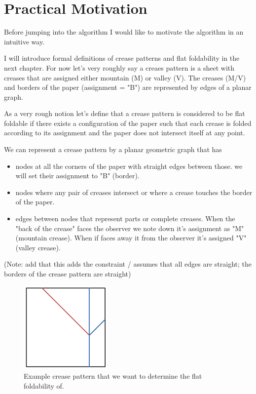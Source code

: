 \chapter{Practical Motivation}

Before jumping into the algorithm I would like to motivate the algorithm in an intuitive way.

I will introduce formal definitions of crease patterns and flat foldability in the next chapter.
For now let's very roughly say a creaes pattern is a sheet with creases that are assigned either mountain (M) or valley (V).
The creases (M/V) and borders of the paper (assignment = "B") are represented by edges of a planar graph.

As a very rough notion let's define that a crease pattern is considered to be flat foldable if there exists a configuration
of the paper such that each crease is folded according to its assignment and the paper does not intersect itself at any point.

We can represent a crease pattern by a planar geometric graph that has
\begin{itemize}
    \item{nodes at all the corners of the paper with straight edges between those. we will set their assignment to "B" (border).}
    \item nodes where any pair of creases intersect or where a crease touches the border of the paper.
    \item edges between nodes that represent parts or complete creases. When the "back of the crease" faces the observer we note down it's assignment as "M" (mountain crease). When if faces away it from the observer it's assigned "V" (valley crease).
\end{itemize}

(Note: add that this adds the constraint / assumes that all edges are straight; the borders of the crease pattern are straight)

\begin{figure}[h]
\centering
\includegraphics[width=0.4\textwidth]{assets/demo_creasepattern.png}
\caption{Example crease pattern that we want to determine the flat foldability of.}
\label{fig:demo_creasepattern}
\end{figure}

